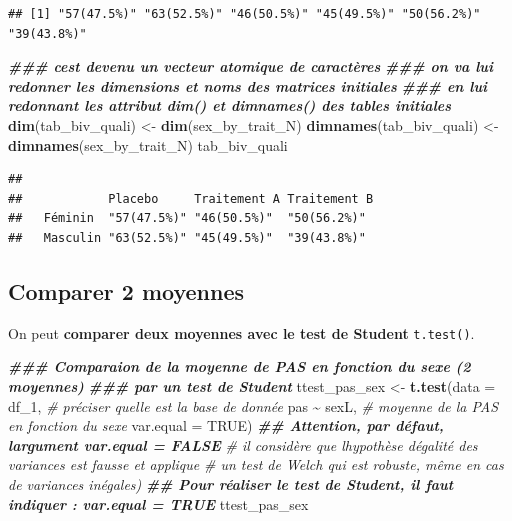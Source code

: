 \documentclass[
]{book}
\newenvironment{Shaded}{\begin{snugshade}}{\end{snugshade}}
\newcommand{\AttributeTok}[1]{\textcolor[rgb]{0.13,0.29,0.53}{#1}}
\newcommand{\CommentTok}[1]{\textcolor[rgb]{0.56,0.35,0.01}{\textit{#1}}}
\newcommand{\ConstantTok}[1]{\textcolor[rgb]{0.56,0.35,0.01}{#1}}
\newcommand{\DocumentationTok}[1]{\textcolor[rgb]{0.56,0.35,0.01}{\textbf{\textit{#1}}}}
\newcommand{\FunctionTok}[1]{\textcolor[rgb]{0.13,0.29,0.53}{\textbf{#1}}}
\newcommand{\NormalTok}[1]{#1}
\newcommand{\OtherTok}[1]{\textcolor[rgb]{0.56,0.35,0.01}{#1}}
\newcommand{\SpecialCharTok}[1]{\textcolor[rgb]{0.81,0.36,0.00}{\textbf{#1}}}
\begin{document}
\begin{verbatim}
## [1] "57(47.5%)" "63(52.5%)" "46(50.5%)" "45(49.5%)" "50(56.2%)" "39(43.8%)"
\end{verbatim}

\begin{Shaded}
\begin{Highlighting}[]
\DocumentationTok{\#\#\# c\textquotesingle{}est devenu un vecteur atomique de caractères}
\DocumentationTok{\#\#\# on va lui redonner les dimensions et noms des matrices initiales}
\DocumentationTok{\#\#\# en lui redonnant les attribut dim() et dimnames() des tables initiales}
\FunctionTok{dim}\NormalTok{(tab\_biv\_quali) }\OtherTok{\textless{}{-}} \FunctionTok{dim}\NormalTok{(sex\_by\_trait\_N)}
\FunctionTok{dimnames}\NormalTok{(tab\_biv\_quali) }\OtherTok{\textless{}{-}} \FunctionTok{dimnames}\NormalTok{(sex\_by\_trait\_N)}
\NormalTok{tab\_biv\_quali}
\end{Highlighting}
\end{Shaded}

\begin{verbatim}
##           
##            Placebo     Traitement A Traitement B
##   Féminin  "57(47.5%)" "46(50.5%)"  "50(56.2%)" 
##   Masculin "63(52.5%)" "45(49.5%)"  "39(43.8%)"
\end{verbatim}

\subsection{Comparer 2 moyennes}\label{comparer-2-moyennes}

On peut \textbf{comparer deux moyennes avec le test de Student} \texttt{t.test()}.

\begin{Shaded}
\begin{Highlighting}[]
\DocumentationTok{\#\#\# Comparaion de la moyenne de PAS en fonction du sexe (2 moyennes) }
\DocumentationTok{\#\#\# par un test de Student}
\NormalTok{ttest\_pas\_sex }\OtherTok{\textless{}{-}} \FunctionTok{t.test}\NormalTok{(}\AttributeTok{data =}\NormalTok{ df\_1, }\CommentTok{\# préciser quelle est la base de donnée}
\NormalTok{                        pas }\SpecialCharTok{\textasciitilde{}}\NormalTok{ sexL, }\CommentTok{\# moyenne de la PAS en fonction du sexe}
                        \AttributeTok{var.equal =} \ConstantTok{TRUE}\NormalTok{) }
\DocumentationTok{\#\# Attention, par défaut, l\textquotesingle{}argument var.equal = FALSE}
\CommentTok{\# il considère que l\textquotesingle{}hypothèse d\textquotesingle{}égalité des variances est fausse et applique}
\CommentTok{\# un test de Welch qui est robuste, même en cas de variances inégales)}
\DocumentationTok{\#\# Pour réaliser le test de Student, il faut indiquer : var.equal = TRUE}
\NormalTok{ttest\_pas\_sex}
\end{Highlighting}
\end{Shaded}
\end{document}
